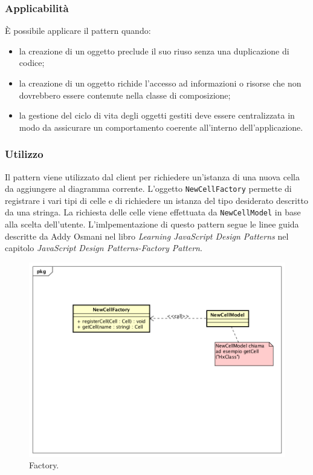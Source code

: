 \subsubsection{Applicabilità} È possibile applicare il pattern quando:
\begin{itemize}
	\item la creazione di un oggetto preclude il suo riuso senza una duplicazione di codice;
	\item la creazione di un oggetto richide l'accesso ad informazioni o risorse che non dovrebbero essere contenute nella classe di composizione;
	\item la gestione del ciclo di vita degli oggetti gestiti deve essere centralizzata in modo da assicurare un comportamento coerente all'interno dell'applicazione.
\end{itemize}

\subsubsection{Utilizzo}
Il pattern viene utilizzato dal client per richiedere un'istanza di una nuova cella da aggiungere al diagramma corrente. L'oggetto \texttt{NewCellFactory} permette di registrare i vari tipi di celle e di richiedere un istanza del tipo desiderato descritto da una stringa. La richiesta delle celle viene effettuata da \texttt{NewCellModel} in base alla scelta dell'utente.
L'imlpementazione di questo pattern segue le linee guida descritte da Addy Osmani nel libro \emph{Learning JavaScript Design Patterns} nel capitolo \emph{JavaScript Design Patterns-Factory Pattern}.
\begin{figure}[H] \label{fig:factory}
	\includegraphics[scale=0.8]{img/factoryExample.png}
	\caption{Factory.}
\end{figure}


